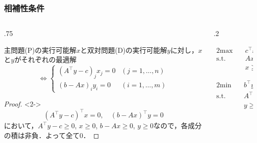 \documentclass[14pt,aspectratio=169,xcolor=dvipsnames,table,onlytextwidth,dvipdfmx]{beamer}
\begin{document}
\begin{frame}
    \frametitle{相補性条件}

    \small
    \begin{columns}[T]
    \begin{column}{.75\textwidth}
    \begin{theorem}[相補性条件]
        主問題(P)の実行可能解$x$と双対問題(D)の実行可能解$y$に対し，$x$と$y$がそれぞれの最適解 
        \[ 
            \iff
            \begin{cases}
        (A^\top y - c)_j x_j = 0  & (j = 1, \dots, n) \\
        (b - Ax)_i y_i = 0        & (i = 1, \dots, m)
            \end{cases}
        \]
    \end{theorem}

    \begin{proof}<2->
    \[
            (A^\top y - c)^\top x = 0, \quad (b - Ax)^\top y = 0  
    \]
    において，$A^\top y - c \geq 0$, $x \geq 0$, $b - Ax \geq 0$, $y \geq 0$なので，各成分の積は非負．よって全て0．
    \end{proof}
    \end{column}
    \begin{column}{.2\textwidth}
    \footnotesize
    \begin{primal}
        \setlength{\abovedisplayskip}{0pt}
        \begin{alignat*}{2}
            \text{max} & \quad  c^\top x \\
            \text{s.t.} & \quad A x \leq b  \\
            & \quad x \geq 0 
        \end{alignat*}
    \end{primal}
    \begin{dual}
        \setlength{\abovedisplayskip}{0pt}
        \begin{alignat*}{2}
            \text{min} & \quad  b^\top y \\
            \text{s.t.} & \quad A^\top y \geq c  \\
            & \quad y \geq 0 
        \end{alignat*}
    \end{dual}
    \end{column}
    \end{columns}
\end{frame}
\end{document}
